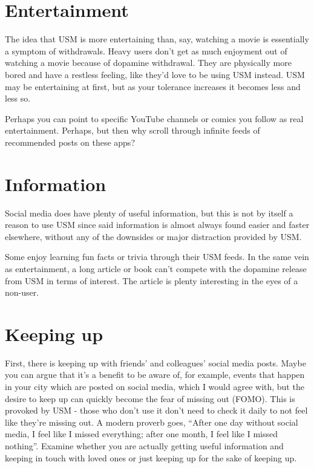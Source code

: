 \documentclass[
  openany]{book}
\begin{document}
\section{Entertainment}\label{entertainment}

The idea that USM is more entertaining than, say, watching a movie is essentially a symptom of withdrawals. Heavy users don't get as much enjoyment out of watching a movie because of dopamine withdrawal. They are physically more bored and have a restless feeling, like they'd love to be using USM instead. USM may be entertaining at first, but as your tolerance increases it becomes less and less so.

Perhaps you can point to specific YouTube channels or comics you follow as real entertainment. Perhaps, but then why scroll through infinite feeds of recommended posts on these apps?

\section{Information}\label{information}

Social media does have plenty of useful information, but this is not by itself a reason to use USM since said information is almost always found easier and faster elsewhere, without any of the downsides or major distraction provided by USM.

Some enjoy learning fun facts or trivia through their USM feeds. In the same vein as entertainment, a long article or book can't compete with the dopamine release from USM in terms of interest. The article is plenty interesting in the eyes of a non-user.

\section{Keeping up}\label{keeping-up}

First, there is keeping up with friends' and colleagues' social media posts. Maybe you can argue that it's a benefit to be aware of, for example, events that happen in your city which are posted on social media, which I would agree with, but the desire to keep up can quickly become the fear of missing out (FOMO). This is provoked by USM - those who don't use it don't need to check it daily to not feel like they're missing out. A modern proverb goes, ``After one day without social media, I feel like I missed everything; after one month, I feel like I missed nothing''. Examine whether you are actually getting useful information and keeping in touch with loved ones or just keeping up for the sake of keeping up.
\end{document}

